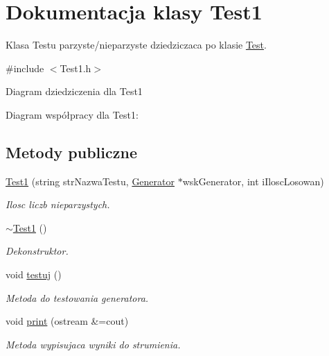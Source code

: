 \hypertarget{classTest1}{\section{Dokumentacja klasy Test1}
\label{classTest1}
}


Klasa Testu parzyste/nieparzyste dziedziczaca po klasie \hyperlink{classTest}{Test}.  




{\ttfamily \#include $<$Test1.\+h$>$}



Diagram dziedziczenia dla Test1


Diagram współpracy dla Test1\+:
\subsection*{Metody publiczne}
\begin{DoxyCompactItemize}
\item 
\hyperlink{classTest1_a56cc1ed1bee9f5bc145232f994b47ae1}{Test1} (string str\+Nazwa\+Testu, \hyperlink{classGenerator}{Generator} $\ast$wsk\+Generator, int i\+Ilosc\+Losowan)
\begin{DoxyCompactList}\small\item\em Ilosc liczb nieparzystych. \end{DoxyCompactList}\item 
\hypertarget{classTest1_ae6ae51777889cb2ebebcdc04e2ad52a4}{\hyperlink{classTest1_ae6ae51777889cb2ebebcdc04e2ad52a4}{$\sim$\+Test1} ()}\label{classTest1_ae6ae51777889cb2ebebcdc04e2ad52a4}

\begin{DoxyCompactList}\small\item\em Dekonstruktor. \end{DoxyCompactList}\item 
void \hyperlink{classTest1_a0198013eddf3e1dd1f0b162343d11297}{testuj} ()
\begin{DoxyCompactList}\small\item\em Metoda do testowania generatora. \end{DoxyCompactList}\item 
void \hyperlink{classTest1_a198852a2e43bcba7c3060b80ff77e9a5}{print} (ostream \&=cout)
\begin{DoxyCompactList}\small\item\em Metoda wypisujaca wyniki do strumienia. \end{DoxyCompactList}\end{DoxyCompactItemize}
